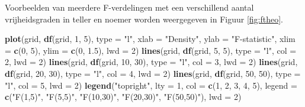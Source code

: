 \documentclass[12pt,dutch,coursenotes]{book}
\newenvironment{Shaded}{\begin{snugshade}}{\end{snugshade}}
\newcommand{\KeywordTok}[1]{\textcolor[rgb]{0.13,0.29,0.53}{\textbf{#1}}}
\newcommand{\DataTypeTok}[1]{\textcolor[rgb]{0.13,0.29,0.53}{#1}}
\newcommand{\DecValTok}[1]{\textcolor[rgb]{0.00,0.00,0.81}{#1}}
\newcommand{\FloatTok}[1]{\textcolor[rgb]{0.00,0.00,0.81}{#1}}
\newcommand{\StringTok}[1]{\textcolor[rgb]{0.31,0.60,0.02}{#1}}
\newcommand{\NormalTok}[1]{#1}
\theoremstyle{definition}
\theoremstyle{definition}
\theoremstyle{definition}
\theoremstyle{remark}
\begin{document}
Voorbeelden van meerdere F-verdelingen met een verschillend aantal
vrijheidsgraden in teller en noemer worden weergegeven in Figuur
\ref{fig:ftheo}.

\begin{Shaded}
\begin{Highlighting}[]
\KeywordTok{plot}\NormalTok{(grid, }\KeywordTok{df}\NormalTok{(grid, }\DecValTok{1}\NormalTok{, }\DecValTok{5}\NormalTok{), }\DataTypeTok{type =} \StringTok{"l"}\NormalTok{, }\DataTypeTok{xlab =} \StringTok{"Density"}\NormalTok{, }
    \DataTypeTok{ylab =} \StringTok{"F-statistic"}\NormalTok{, }\DataTypeTok{xlim =} \KeywordTok{c}\NormalTok{(}\DecValTok{0}\NormalTok{, }\DecValTok{5}\NormalTok{), }\DataTypeTok{ylim =} \KeywordTok{c}\NormalTok{(}\DecValTok{0}\NormalTok{, }
        \FloatTok{1.5}\NormalTok{), }\DataTypeTok{lwd =} \DecValTok{2}\NormalTok{)}
\KeywordTok{lines}\NormalTok{(grid, }\KeywordTok{df}\NormalTok{(grid, }\DecValTok{5}\NormalTok{, }\DecValTok{5}\NormalTok{), }\DataTypeTok{type =} \StringTok{"l"}\NormalTok{, }\DataTypeTok{col =} \DecValTok{2}\NormalTok{, }\DataTypeTok{lwd =} \DecValTok{2}\NormalTok{)}
\KeywordTok{lines}\NormalTok{(grid, }\KeywordTok{df}\NormalTok{(grid, }\DecValTok{10}\NormalTok{, }\DecValTok{30}\NormalTok{), }\DataTypeTok{type =} \StringTok{"l"}\NormalTok{, }\DataTypeTok{col =} \DecValTok{3}\NormalTok{, }
    \DataTypeTok{lwd =} \DecValTok{2}\NormalTok{)}
\KeywordTok{lines}\NormalTok{(grid, }\KeywordTok{df}\NormalTok{(grid, }\DecValTok{20}\NormalTok{, }\DecValTok{30}\NormalTok{), }\DataTypeTok{type =} \StringTok{"l"}\NormalTok{, }\DataTypeTok{col =} \DecValTok{4}\NormalTok{, }
    \DataTypeTok{lwd =} \DecValTok{2}\NormalTok{)}
\KeywordTok{lines}\NormalTok{(grid, }\KeywordTok{df}\NormalTok{(grid, }\DecValTok{50}\NormalTok{, }\DecValTok{50}\NormalTok{), }\DataTypeTok{type =} \StringTok{"l"}\NormalTok{, }\DataTypeTok{col =} \DecValTok{5}\NormalTok{, }
    \DataTypeTok{lwd =} \DecValTok{2}\NormalTok{)}
\KeywordTok{legend}\NormalTok{(}\StringTok{"topright"}\NormalTok{, }\DataTypeTok{lty =} \DecValTok{1}\NormalTok{, }\DataTypeTok{col =} \KeywordTok{c}\NormalTok{(}\DecValTok{1}\NormalTok{, }\DecValTok{2}\NormalTok{, }\DecValTok{3}\NormalTok{, }\DecValTok{4}\NormalTok{, }\DecValTok{5}\NormalTok{), }
    \DataTypeTok{legend =} \KeywordTok{c}\NormalTok{(}\StringTok{"F(1,5)"}\NormalTok{, }\StringTok{"F(5,5)"}\NormalTok{, }\StringTok{"F(10,30)"}\NormalTok{, }\StringTok{"F(20,30)"}\NormalTok{, }
        \StringTok{"F(50,50)"}\NormalTok{), }\DataTypeTok{lwd =} \DecValTok{2}\NormalTok{)}
\end{Highlighting}
\end{Shaded}
\end{document}
